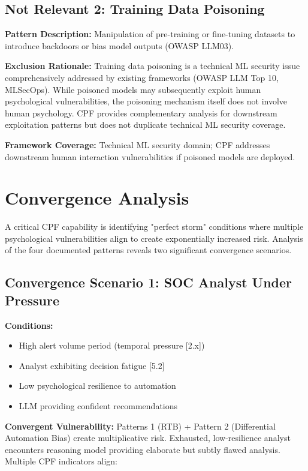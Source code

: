 \documentclass[11pt,a4paper]{article}
\begin{document}
\subsection{Not Relevant 2: Training Data Poisoning}

\textbf{Pattern Description:} Manipulation of pre-training or fine-tuning datasets to introduce backdoors or bias model outputs (OWASP LLM03)\cite{owasp2025llm}.

\textbf{Exclusion Rationale:} Training data poisoning is a technical ML security issue comprehensively addressed by existing frameworks (OWASP LLM Top 10, MLSecOps). While poisoned models may subsequently exploit human psychological vulnerabilities, the poisoning mechanism itself does not involve human psychology. CPF provides complementary analysis for downstream exploitation patterns but does not duplicate technical ML security coverage.

\textbf{Framework Coverage:} Technical ML security domain; CPF addresses downstream human interaction vulnerabilities if poisoned models are deployed.

\section{Convergence Analysis}

A critical CPF capability is identifying "perfect storm" conditions where multiple psychological vulnerabilities align to create exponentially increased risk. Analysis of the four documented patterns reveals two significant convergence scenarios.

\subsection{Convergence Scenario 1: SOC Analyst Under Pressure}

\textbf{Conditions:}
\begin{itemize}
\item High alert volume period (temporal pressure [2.x])
\item Analyst exhibiting decision fatigue [5.2]
\item Low psychological resilience to automation
\item LLM providing confident recommendations
\end{itemize}

\textbf{Convergent Vulnerability:} Patterns 1 (RTB) + Pattern 2 (Differential Automation Bias) create multiplicative risk. Exhausted, low-resilience analyst encounters reasoning model providing elaborate but subtly flawed analysis. Multiple CPF indicators align:
\end{document}

